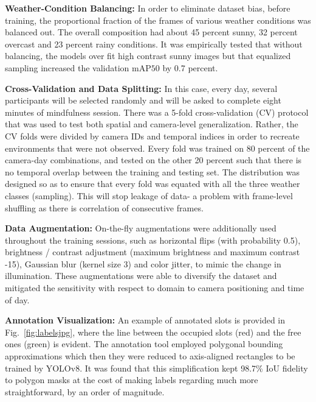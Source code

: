 \documentclass[conference]{IEEEtran}
\begin{document}
\vspace{0.3em}
\noindent\textbf{Weather-Condition Balancing:}
In order to eliminate dataset bias, before training, the proportional fraction of the frames of various weather conditions was balanced out. The overall composition had about 45 percent sunny, 32 percent overcast and 23 percent rainy conditions. It was empirically tested that without balancing, the models over fit high contrast sunny images but that equalized sampling increased the validation mAP${50}$ by 0.7 percent.

\vspace{0.3em}
\noindent\textbf{Cross-Validation and Data Splitting:}
In this case, every day, several participants will be selected randomly and will be asked to complete eight minutes of mindfulness session. There was a 5-fold cross-validation (CV) protocol that was used to test both spatial and camera-level generalization. Rather, the CV folds were divided by camera IDs and temporal indices in order to recreate environments that were not observed. Every fold was trained on 80 percent of the camera-day combinations, and tested on the other 20 percent such that there is no temporal overlap between the training and testing set. The distribution was designed so as to ensure that every fold was equated with all the three weather classes (sampling). This will stop leakage of data- a problem with frame-level shuffling as there is correlation of consecutive frames.

\vspace{0.3em}
\noindent\textbf{Data Augmentation:}
On-the-fly augmentations were additionally used throughout the training sessions, such as horizontal flips (with probability 0.5), brightness / contrast adjustment (maximum brightness and maximum contrast -15), Gaussian blur (kernel size 3) and color jitter, to mimic the change in illumination. These augmentations were able to diversify the dataset and mitigated the sensitivity with respect to domain to camera positioning and time of day.

\vspace{0.3em}
\noindent\textbf{Annotation Visualization:}
An example of annotated slots is provided in Fig.~\ref{fig:labelsjpg}, where the line between the occupied slots (red) and the free ones (green) is evident. The annotation tool employed polygonal bounding approximations which then they were reduced to axis-aligned rectangles to be trained by YOLOv8. It was found that this simplification kept 98.7\% IoU fidelity to polygon masks at the cost of making labels regarding much more straightforward, by an order of magnitude.
\end{document}
